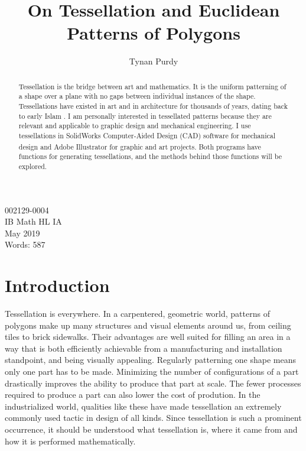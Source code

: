 \documentclass[12pt,letterpaper]{article}
\title{On Tessellation and Euclidean Patterns of Polygons}
\author{Tynan Purdy}
\date{\vspace{-5ex}}
\begin{document}
\large
\parindent=0.5in
{\fontsize{12}{14.4}
	{\singlespace
	\maketitle
	\begin{center}
	\vspace{4mm}
	002129-0004 \\
	\vspace{4mm}
	IB Math HL IA \\
	\vspace{4mm}
	May 2019 \\
	\vspace{4mm}
	Words: 587\\
	\end{center}
	}
}	

\newpage
{}
\begin{abstract}
Tessellation is the bridge between art and mathematics. It is the uniform patterning of a shape over a plane with no gaps between individual instances of the shape. Tessellations have existed in art and in architecture for thousands of years, dating back to early Islam \citep{arabic}. I am personally interested in tessellated patterns because they are relevant and applicable to graphic design and mechanical engineering. I use tessellations in SolidWorks Computer-Aided Design (CAD) software for mechanical design and Adobe Illustrator\textsuperscript{\textregistered} for graphic and art projects. Both programs have functions for generating tessellations, and the methods behind those functions will be explored.
\end{abstract}

\newpage
\tableofcontents

\newpage
\section{Introduction}
Tessellation is everywhere. In a carpentered, geometric world, patterns of polygons make up many structures and visual elements around us, from ceiling tiles to brick sidewalks. Their advantages are well suited for filling an area in a way that is both efficiently achievable from a manufacturing and installation standpoint, and being visually appealing. Regularly patterning one shape means only one part has to be made. Minimizing the number of configurations of a part drastically improves the ability to produce that part at scale. The fewer processes required to produce a part can also lower the cost of prodution. In the industrialized world, qualities like these have made tessellation an extremely commonly used tactic in design of all kinds. Since tessellation is such a prominent occurrence, it should be understood what tessellation is, where it came from and how it is performed mathematically.
\end{document}
